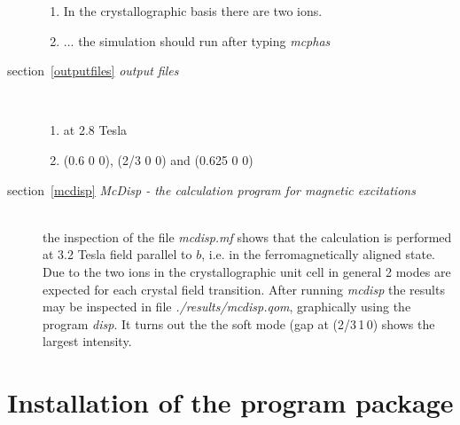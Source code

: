 \documentclass[twoside]{article}
\newcommand{\prg}{\sl}
\begin{document}
\begin{description}
 \begin{enumerate}
 \item In the crystallographic basis there are two ions.
 \item ... the simulation should run after typing {\prg mcphas}
 \end{enumerate}
\item[section~\ref{outputfiles} {\em output files}] \ 
 \begin{enumerate}
 \item at 2.8 Tesla
 \item (0.6 0 0), (2/3 0 0) and (0.625 0 0)
 \end{enumerate}
\item[section~\ref{mcdisp} {\em {\prg McDisp} - the calculation program for magnetic excitations}] \ \\
 the inspection of the file {\prg mcdisp.mf\index{mcdisp.mf}} shows that the calculation is performed at 3.2 Tesla field
 parallel to $b$, i.e. in the ferromagnetically aligned state. Due to the two ions in the crystallographic
 unit cell in general 2 modes are expected for each crystal field transition. After running {\prg mcdisp}
 the results may be inspected in file {\prg ./results/mcdisp.qom}, graphically using the program {\prg disp}.
 It turns out the the soft mode (gap at (2/3\,1\,0) shows the largest intensity.
\end{description}

\clearpage
\section{Installation of the program package}




\newpage


\newpage
\printindex

\end{document}
